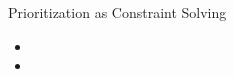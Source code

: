 \begin{Slide}{Prioritization as Constraint Solving}

\begin{itemize}
\item {}
\item {}
\end{itemize}
\end{Slide}